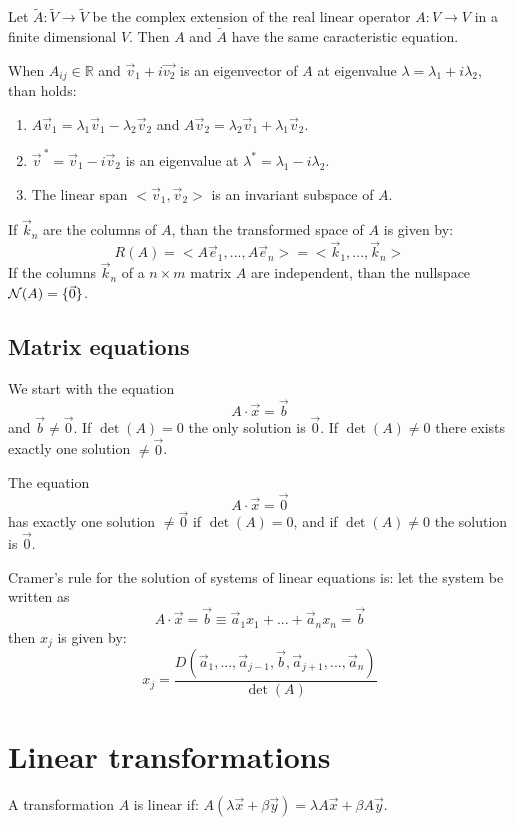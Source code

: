 Let $\tilde{A}:\tilde{V}\rightarrow\tilde{V}$ be the complex extension of the
real linear operator $A:V\rightarrow V$ in a finite dimensional $V$.
Then $A$ and $\tilde{A}$ have the same caracteristic equation.

When $A_{ij}\in \mathbb{R}$ and $\vec{v}_1+i\vec{v_2}$ is an eigenvector of $A$
at eigenvalue $\lambda=\lambda_1+i\lambda_2$, than holds:
\begin{enumerate}
	\item $A\vec{v}_1=\lambda_1\vec{v}_1-\lambda_2\vec{v}_2$ and $A\vec{v}_2=\lambda_2\vec{v}_1+\lambda_1\vec{v}_2$.
	\item $\vec{v}^{~*}=\vec{v}_1-i\vec{v}_2$ is an eigenvalue at $\lambda^*=\lambda_1-i\lambda_2$.
	\item The linear span $<\vec{v}_1,\vec{v}_2>$ is an invariant subspace of $A$.
\end{enumerate}
If $\vec{k}_n$ are the columns of $A$, than the transformed space of $A$ is
given by:
\[
R(A)=<A\vec{e}_1,...,A\vec{e}_n>=<\vec{k}_1,...,\vec{k}_n>
\]
If the columns $\vec{k}_n$ of a $n\times m$ matrix $A$ are independent, than
the nullspace ${\cal N}(A)=\{\vec{0}\}$.

\subsection{Matrix equations}
We start with the equation
\[
A\cdot\vec{x}=\vec{b}
\]
and $\vec{b}\neq\vec{0}$. If $\det(A)=0$ the only solution is $\vec{0}$. If
$\det(A)\neq0$ there exists exactly one solution $\neq\vec{0}$.

The equation
\[
A\cdot\vec{x}=\vec{0}
\]
has exactly one solution $\neq\vec{0}$ if $\det(A)=0$, and if
$\det(A)\neq0$ the solution is $\vec{0}$.

Cramer's rule for the solution of systems of linear equations is: let the
system be written as
\[
A\cdot\vec{x}=\vec{b}\equiv\vec{a}_1x_1+...+\vec{a}_nx_n=\vec{b}
\]
then $x_j$ is given by:
\[
x_j=\frac{D(\vec{a}_1,...,\vec{a}_{j-1},\vec{b},\vec{a}_{j+1},...,\vec{a}_n)}{\det(A)}
\]

\section{Linear transformations}
A transformation $A$ is linear if:
$A(\lambda\vec{x}+\beta\vec{y})=\lambda A\vec{x}+\beta A\vec{y}$.

